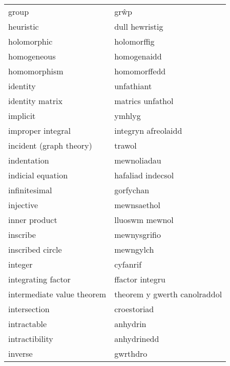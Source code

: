 \begin{supertabular}{p{0.22\textwidth}p{0.22\textwidth}}
                            group &                             grŵp \\
                        heuristic &                   dull hewristig \\
                      holomorphic &                      holomorffig \\
                      homogeneous &                      homogenaidd \\
                     homomorphism &                     homomorffedd \\
                         identity &                       unfathiant \\
                  identity matrix &                 matrics unfathol \\
                         implicit &                           ymhlyg \\
                improper integral &              integryn afreolaidd \\
          incident (graph theory) &                           trawol \\
                      indentation &                      mewnoliadau \\
                indicial equation &                hafaliad indecsol \\
                    infinitesimal &                        gorfychan \\
                        injective &                      mewnsaethol \\
                    inner product &                   lluoswm mewnol \\
                         inscribe &                     mewnysgrifio \\
                 inscribed circle &                        mewngylch \\
                          integer &                         cyfanrif \\
               integrating factor &                  ffactor integru \\
       intermediate value theorem &     theorem y gwerth canolraddol \\
                     intersection &                      croestoriad \\
                      intractable &                         anhydrin \\
                   intractibility &                      anhydrinedd \\
                          inverse &                         gwrthdro \\

\end{supertabular}
